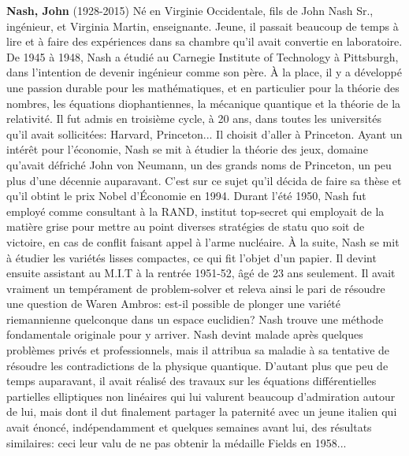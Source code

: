 \textbf{Nash, John} (1928-2015) Né en Virginie Occidentale, fils de John Nash Sr., ingénieur, et Virginia Martin, enseignante. Jeune, il passait beaucoup de temps à lire et à faire des expériences dans sa chambre qu'il avait convertie en laboratoire. De 1945 à 1948, Nash a étudié au Carnegie Institute of Technology à Pittsburgh, dans l'intention de devenir ingénieur comme son père. À la place, il y a développé une passion durable pour les mathématiques, et en particulier pour la théorie des nombres, les équations diophantiennes, la mécanique quantique et la théorie de la relativité. Il fut admis en troisième cycle, à 20 ans, dans toutes les universités qu'il avait sollicitées: Harvard, Princeton... Il choisit d'aller à Princeton. Ayant un intérêt pour l'économie, Nash se mit à étudier la théorie des jeux, domaine qu'avait défriché John von Neumann, un des grands noms de Princeton, un peu plus d'une décennie auparavant. C'est sur ce sujet qu'il décida de faire sa thèse et qu'il obtint le prix Nobel d'Économie en 1994. Durant l'été 1950, Nash fut employé comme consultant à la RAND, institut top-secret qui employait de la matière grise pour mettre au point diverses stratégies de statu quo soit de victoire, en cas de conflit faisant appel à l'arme nucléaire. À la suite, Nash se mit à étudier les variétés lisses compactes, ce qui fit l'objet d'un papier. Il devint ensuite assistant au M.I.T à la rentrée 1951-52, âgé de 23 ans seulement. Il avait vraiment un tempérament de problem-solver et releva ainsi le pari de résoudre une question de Waren Ambros: est-il possible de plonger une variété riemannienne quelconque dans un espace euclidien? Nash trouve une méthode fondamentale originale pour y arriver. Nash devint malade après quelques problèmes privés et professionnels, mais il attribua sa maladie à sa tentative de résoudre les contradictions de la physique quantique. D'autant plus que peu de temps auparavant, il avait réalisé des travaux sur les équations différentielles partielles elliptiques non linéaires qui lui valurent beaucoup d'admiration autour de lui, mais dont il dut finalement partager la paternité avec un jeune italien qui avait énoncé, indépendamment et quelques semaines avant lui, des résultats similaires: ceci leur valu de ne pas obtenir la médaille Fields en 1958...

